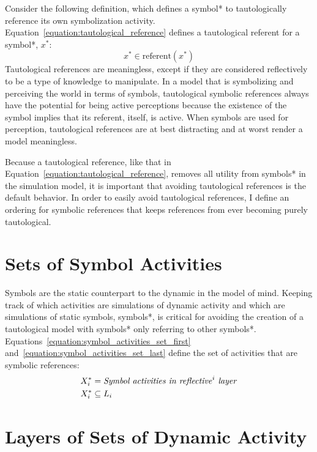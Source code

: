 Consider the following definition, which defines a symbol* to
tautologically reference its own symbolization activity.
Equation~\ref{equation:tautological_reference} defines a tautological
referent for a symbol*, $x^*$:
\begin{equation}
\label{equation:tautological_reference}
x^* \in \text{referent}(x^*)
\end{equation}
Tautological references are meaningless, except if they are considered
reflectively to be a type of knowledge to manipulate.  In a model that
is symbolizing and perceiving the world in terms of symbols,
tautological symbolic references always have the potential for being
active perceptions because the existence of the symbol implies that
its referent, itself, is active.  When symbols are used for
perception, tautological references are at best distracting and at
worst render a model meaningless.

Because a tautological reference, like that in
Equation~\ref{equation:tautological_reference}, removes all utility
from symbols* in the simulation model, it is important that avoiding
tautological references is the default behavior.  In order to easily
avoid tautological references, I define an ordering for symbolic
references that keeps references from ever becoming purely
tautological.

\section{Sets of Symbol Activities}

Symbols are the static counterpart to the dynamic in the model of
mind.  Keeping track of which activities are simulations of dynamic
activity and which are simulations of static symbols, symbols*, is
critical for avoiding the creation of a tautological model with
symbols* only referring to other symbols*.
Equations~\ref{equation:symbol_activities_set_first}
and~\ref{equation:symbol_activities_set_last} define the set of
activities that are symbolic references:
\begin{align}
\label{equation:symbol_activities_set_first}
X^*_i &= \text{\emph{Symbol activities in reflective}}^i\text{\emph{ layer}} \\
\label{equation:symbol_activities_set_last}
X^*_i &\subseteq L_i
\end{align}

\section{Layers of Sets of Dynamic Activity}

